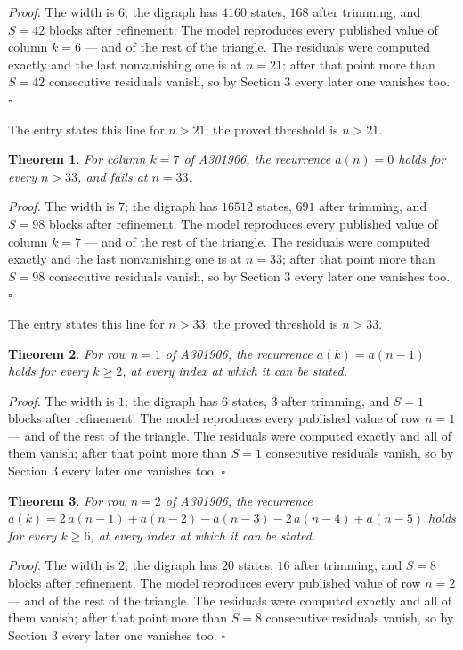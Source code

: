 \documentclass[11pt]{article}
\newtheorem{theorem}{Theorem}
\theoremstyle{definition}
\begin{document}
{\itshape Proof.} The width is $6$; the digraph has $4160$ states, $168$ after trimming, and $S = 42$ blocks after refinement. The model reproduces every published value of column $k = 6$ --- and of the rest of the triangle. The residuals were computed exactly and the last nonvanishing one is at $n = 21$; after that point more than $S = 42$ consecutive residuals vanish, so by Section 3 every later one vanishes too. $\square$

The entry states this line for $n > 21$; the proved threshold is $n > 21$.

\begin{theorem} For column $k = 7$ of A301906, the recurrence $a(n) = 0$ holds for every $n > 33$, and fails at $n = 33$.\end{theorem}

{\itshape Proof.} The width is $7$; the digraph has $16512$ states, $691$ after trimming, and $S = 98$ blocks after refinement. The model reproduces every published value of column $k = 7$ --- and of the rest of the triangle. The residuals were computed exactly and the last nonvanishing one is at $n = 33$; after that point more than $S = 98$ consecutive residuals vanish, so by Section 3 every later one vanishes too. $\square$

The entry states this line for $n > 33$; the proved threshold is $n > 33$.

\begin{theorem} For row $n = 1$ of A301906, the recurrence $a(k) = a(n-1)$ holds for every $k \ge 2$, at every index at which it can be stated.\end{theorem}

{\itshape Proof.} The width is $1$; the digraph has $6$ states, $3$ after trimming, and $S = 1$ blocks after refinement. The model reproduces every published value of row $n = 1$ --- and of the rest of the triangle. The residuals were computed exactly and all of them vanish; after that point more than $S = 1$ consecutive residuals vanish, so by Section 3 every later one vanishes too. $\square$

\begin{theorem} For row $n = 2$ of A301906, the recurrence $a(k) = 2\,a(n-1) + a(n-2) - a(n-3) - 2\,a(n-4) + a(n-5)$ holds for every $k \ge 6$, at every index at which it can be stated.\end{theorem}

{\itshape Proof.} The width is $2$; the digraph has $20$ states, $16$ after trimming, and $S = 8$ blocks after refinement. The model reproduces every published value of row $n = 2$ --- and of the rest of the triangle. The residuals were computed exactly and all of them vanish; after that point more than $S = 8$ consecutive residuals vanish, so by Section 3 every later one vanishes too. $\square$
\end{document}
